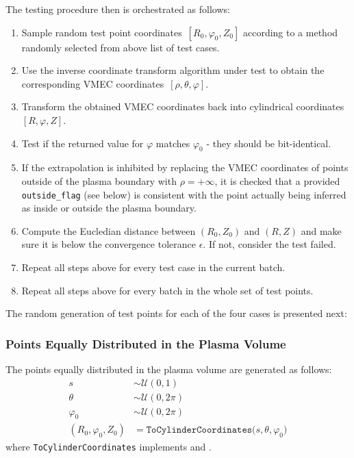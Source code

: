 The testing procedure then is orchestrated as follows:
\begin{enumerate}
 \item Sample random test point coordinates~$[R_0, \varphi_0, Z_0]$ according to a method randomly selected from above list of test cases.
 \item Use the inverse coordinate transform algorithm under test to obtain the corresponding VMEC coordinates~$[\rho, \theta, \varphi]$.
 \item Transform the obtained VMEC coordinates back into cylindrical coordinates~$[R, \varphi, Z]$.
 \item Test if the returned value for $\varphi$ matches $\varphi_0$ - they should be bit-identical.
 \item If the extrapolation is inhibited by replacing the VMEC coordinates of points outside of the plasma boundary
       with $\rho = +\infty$, it is checked that a provided \texttt{outside\_flag} (see below) is consistent with the point
       actually being inferred as inside or outside the plasma boundary.
 \item Compute the Eucledian distance between $(R_0, Z_0)$ and $(R, Z)$ and make sure it is below the convergence tolerance $\epsilon$.
       If not, consider the test failed.
 \item Repeat all steps above for every test case in the current batch.
 \item Repeat all steps above for every batch in the whole set of test points.
\end{enumerate}
%
The random generation of test points for each of the four cases is presented next:
%
\subsubsection{Points Equally Distributed in the Plasma Volume}
%
The points equally distributed in the plasma volume are generated as follows:
\begin{align}
  s &\sim \mathcal{U}(0,1)\\
  \theta &\sim \mathcal{U}(0,2\pi)\\
  \varphi_0 &\sim \mathcal{U}(0,2\pi)\\
  (R_0, \varphi_0, Z_0) &= \texttt{ToCylinderCoordinates}\bigl(s, \theta, \varphi_0 \bigr)
\end{align}
%
where \texttt{ToCylinderCoordinates} implements  and .


